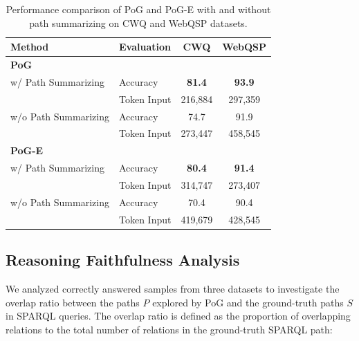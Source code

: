\begin{table}[h]
\caption{Performance comparison of PoG and PoG-E with and without path summarizing on CWQ and WebQSP datasets.}\label{fig:ablation:summ_prompt}
\begin{tabular}{@{}llcc@{}}
\toprule
\textbf{Method}      & \textbf{Evaluation} & \textbf{CWQ} & \textbf{WebQSP} \\ \midrule
\textbf{PoG}         &                     &              &                 \\
w/ Path Summarizing   & Accuracy           & \textbf{81.4 }        & \textbf{93.9}            \\
                     & Token Input         & 216,884      & 297,359         \\
w/o Path Summarizing & Accuracy           & 74.7         & 91.9            \\
                     & Token Input         & 273,447      & 458,545         \\ \midrule
\textbf{PoG-E}       & \textbf{}           & \textbf{}    & \textbf{}       \\
w/ Path Summarizing   & Accuracy           & \textbf{80.4 }        & \textbf{91.4}            \\
                     & Token Input         & 314,747      & 273,407         \\
w/o Path Summarizing & Accuracy           & 70.4         & 90.4            \\
                     & Token Input         & 419,679      & 428,545         \\ \bottomrule
\end{tabular}
\end{table}



\newpage
\subsection{Reasoning Faithfulness Analysis}\label{appendix:exp:reasoning_faithful}
We analyzed correctly answered samples from three datasets to investigate the overlap ratio between the paths $P$ explored by PoG and the ground-truth paths $S$ in SPARQL queries. The overlap ratio is defined as the proportion of overlapping relations to the total number of relations in the ground-truth SPARQL path:

